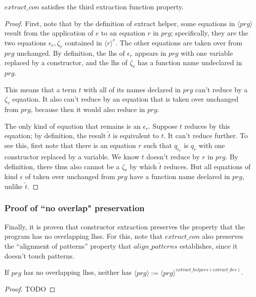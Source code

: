\begin{lemma}

$extract\_con$ satisfies the third extraction function property.

\begin{proof}

First, note that by the definition of extract helper, some equations in $\langle prg \rangle$ result from the application of $e$ to an equation $r$ in $prg$; specifically, they are the two equations $\epsilon_r, \zeta_r$ contained in $\langle r \rangle^e$. The other equations are taken over from $prg$ unchanged. By definition, the lhs of $\epsilon_r$ appears in $prg$ with one variable replaced by a constructor, and the lhs of $\zeta_r$ has a function name undeclared in $prg$.

This means that a term $t$ with all of its names declared in $prg$ can't reduce by a $\zeta_r$ equation. It also can't reduce by an equation that is taken over unchanged from $prg$, because then it would also reduce in $prg$.

The only kind of equation that remains is an $\epsilon_r$. Suppose $t$ reduces by this equation; by definition, the result $\widetilde{t}$ is equivalent to $t$. It can't reduce further. To see this, first note that there is an equation $r$ such that $q_{\epsilon_r}$ is $q_r$ with one constructor replaced by a variable. We know $t$ doesn't reduce by $r$ in $prg$. By definition, there thus also cannot be a $\zeta_r$ by which $\widetilde{t}$ reduces. But all equations of kind $\epsilon$ of taken over unchanged from $prg$ have a function name declared in $prg$, unlike $\widetilde{t}$.

\end{proof}

\end{lemma}

\subsubsection{Proof of ``no overlap" preservation}

Finally, it is proven that constructor extraction preserves the property that the program has no overlapping lhss. For this, note that $extract\_con$ also preserves the ``alignment of patterns'' property that $align\_patterns$ establishes, since it doesn't touch patterns.

\begin{lemma}

If $prg$ has no overlapping lhss, neither has $\langle prg \rangle := \langle prg \rangle^{extract\_helpers(extract\_des)}$.

\begin{proof}

TODO

\end{proof}

\end{lemma}

